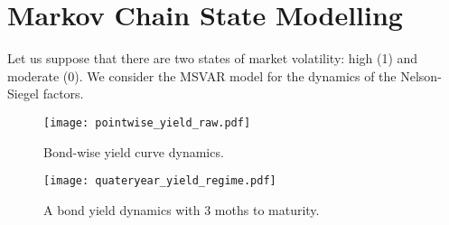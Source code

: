\section{Markov Chain State Modelling}\label{sec:MCSM}
    Let us suppose that there are two states of market volatility: high (1) and moderate (0).
    We consider the MSVAR model for the dynamics of the Nelson-Siegel factors.


    \begin{figure}[htbp]
        \texttt{[image: pointwise\_yield\_raw.pdf]}
        \caption{Bond-wise yield curve dynamics.}
        \label{fig:yieldraw}
    \end{figure}

    \begin{figure}[htbp]
        \texttt{[image: quateryear\_yield\_regime.pdf]}
        \caption{A bond yield dynamics with 3 moths to maturity.}
        \label{fig:quateryear}
    \end{figure}


